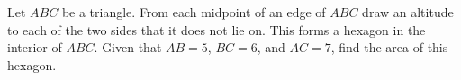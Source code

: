 Let $ABC$ be a triangle. From each midpoint of an edge of $ABC$ draw an altitude to each of the two sides that it does not lie on. This forms a hexagon in the interior of $ABC$. Given that $AB=5$, $BC=6$, and $AC=7$, find the area of this hexagon.
